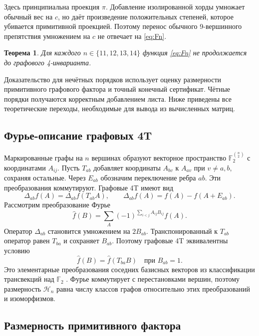 \documentclass[11pt,a4paper]{article}
\numberwithin{equation}{section}
\newtheorem{theorem}{Теорема}[section]
\theoremstyle{definition}
\theoremstyle{remark}
\newcommand{\F}{\mathbb F}
\begin{document}
Здесь принципиальна проекция $\pi$. Добавление изолированной хорды
умножает обычный вес на $c$, но даёт произведение положительных степеней,
которое убивается примитивной проекцией. Поэтому перенос обычного
9-вершинного препятствия умножением на $c$ не отвечает на
\eqref{eq:Fn}.

\begin{theorem}\label{thm:extension}
Для каждого $n\in\{11,12,13,14\}$ функция \eqref{eq:Fn}
не продолжается до графового 4-инварианта.
\end{theorem}
Доказательство для нечётных порядков использует оценку размерности
примитивного графового фактора и точный конечный сертификат.
Чётные порядки получаются корректным добавлением листа.
Ниже приведены все теоретические переходы, необходимые для вывода
из вычисленных матриц.

\subsection{Фурье-описание графовых 4T}

Маркированные графы на $n$ вершинах образуют векторное пространство
$\F_2^{\binom n2}$ с координатами $A_{ij}$.
Пусть $T_{ab}$ добавляет координаты $A_{bv}$ к $A_{av}$ при
$v\ne a,b$, сохраняя остальные. Через $E_{ab}$ обозначим
переключение ребра $ab$. Эти преобразования коммутируют.
Графовые 4T имеют вид
\[
 \Delta_{ab}f(A)=\Delta_{ab}f(T_{ab}A),\qquad
 \Delta_{ab}f(A)=f(A)-f(A+E_{ab}).
\]
Рассмотрим преобразование Фурье
\[
 \widehat f(B)=\sum_A(-1)^{\sum_{i<j}A_{ij}B_{ij}}f(A).
\]
Оператор $\Delta_{ab}$ становится умножением на $2B_{ab}$.
Транспонированный к $T_{ab}$ оператор равен $T_{ba}$ и сохраняет
$B_{ab}$. Поэтому графовые 4T эквивалентны условию
\begin{equation}\label{eq:fourier}
 \widehat f(B)=\widehat f(T_{ba}B)\quad\text{при }B_{ab}=1.
\end{equation}
Это элементарные преобразования соседних базисных векторов
из классификации трансвекций над $\F_2$ \cite{seven}.
Фурье коммутирует с перестановками вершин, поэтому размерность
$\mathcal H_n$ равна числу классов графов относительно этих
преобразований и изоморфизмов.

\subsection{Размерность примитивного фактора}
\end{document}
